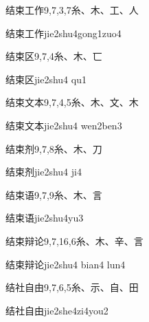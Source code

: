 \begin{Entry}{结束工作}{9,7,3,7}{⽷、⽊、⼯、⼈}
  \begin{Phonetics}{结束工作}{jie2shu4gong1zuo4}
  \end{Phonetics}
\end{Entry}

\begin{Entry}{结束区}{9,7,4}{⽷、⽊、⼖}
  \begin{Phonetics}{结束区}{jie2shu4 qu1}
  \end{Phonetics}
\end{Entry}

\begin{Entry}{结束文本}{9,7,4,5}{⽷、⽊、⽂、⽊}
  \begin{Phonetics}{结束文本}{jie2shu4 wen2ben3}
  \end{Phonetics}
\end{Entry}

\begin{Entry}{结束剂}{9,7,8}{⽷、⽊、⼑}
  \begin{Phonetics}{结束剂}{jie2shu4 ji4}
  \end{Phonetics}
\end{Entry}

\begin{Entry}{结束语}{9,7,9}{⽷、⽊、⾔}
  \begin{Phonetics}{结束语}{jie2shu4yu3}
  \end{Phonetics}
\end{Entry}

\begin{Entry}{结束辩论}{9,7,16,6}{⽷、⽊、⾟、⾔}
  \begin{Phonetics}{结束辩论}{jie2shu4 bian4 lun4}
  \end{Phonetics}
\end{Entry}

\begin{Entry}{结社自由}{9,7,6,5}{⽷、⽰、⾃、⽥}
  \begin{Phonetics}{结社自由}{jie2she4zi4you2}
  \end{Phonetics}
\end{Entry}

